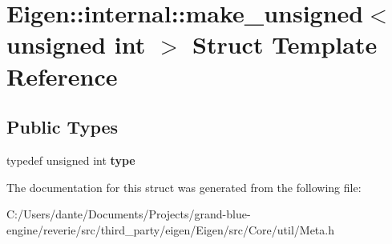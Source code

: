 \hypertarget{struct_eigen_1_1internal_1_1make__unsigned_3_01unsigned_01int_01_4}{}\section{Eigen\+::internal\+::make\+\_\+unsigned$<$ unsigned int $>$ Struct Template Reference}
\label{struct_eigen_1_1internal_1_1make__unsigned_3_01unsigned_01int_01_4}
\subsection*{Public Types}
\begin{DoxyCompactItemize}
\item 
\mbox{\label{struct_eigen_1_1internal_1_1make__unsigned_3_01unsigned_01int_01_4_aef6509b90d2d31d230051b8c475d77cd}} 
typedef unsigned int {\bfseries type}
\end{DoxyCompactItemize}


The documentation for this struct was generated from the following file\+:\begin{DoxyCompactItemize}
\item 
C\+:/\+Users/dante/\+Documents/\+Projects/grand-\/blue-\/engine/reverie/src/third\+\_\+party/eigen/\+Eigen/src/\+Core/util/Meta.\+h\end{DoxyCompactItemize}
